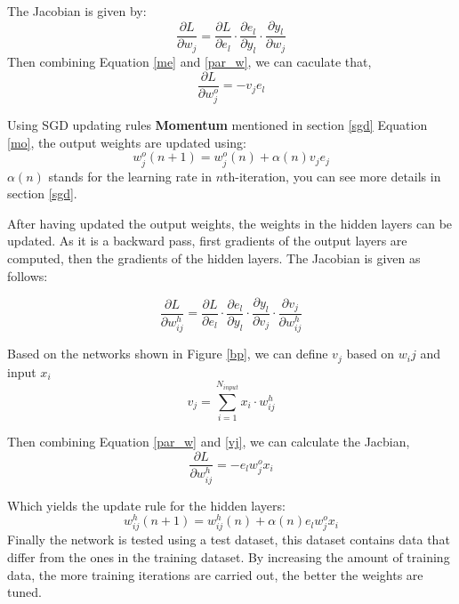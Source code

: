     The Jacobian is given by:
    \begin{equation}
        \frac{\partial L}{\partial w_{j}} = \frac{\partial L}{\partial e_l} \cdot \frac{\partial e_l}{\partial y_l} \cdot \frac{\partial y_l}{\partial w_{j}}
        \label{par_w}
    \end{equation}
    Then combining Equation \ref{me} and \ref{par_w}, we can caculate that,
    \begin{equation}
        \frac{\partial L}{\partial w^{o}_{j}} = -v_j e_l
    \end{equation}

    Using SGD updating rules \textbf{Momentum} mentioned in section \ref{sgd} Equation \ref{mo}, the output weights are updated using:
    \begin{equation}
        w^{o}_{j}(n+1) = w^{o}_{j}(n) + \alpha(n)v_j e_j
    \end{equation}
    $\alpha(n)$ stands for the learning rate in $n$th-iteration, you can see more details in section \ref{sgd}.

    After having updated the output weights, the weights in the hidden layers can be updated. As it is a backward pass, first gradients of the output layers are computed, then the gradients of the hidden layers. The Jacobian is given as follows:

    \begin{equation}
        \frac{\partial L}{\partial w^{h}_{ij}} = \frac{\partial L}{\partial e_l} \cdot \frac{\partial e_l}{\partial y_l} \cdot \frac{\partial y_l}{\partial v_{j}} \cdot \frac{\partial v_j}{\partial w^{h}_{ij}}
        \label{par_w}
    \end{equation}

    Based on the networks shown in Figure \ref{bp}, we can define $v_j$ based on $w_ij$ and input $x_i$
    \begin{equation}
        v_j = \sum_{i=1}^{N_{input}}x_i\cdot w^{h}_{ij}
        \label{vj}
    \end{equation}


    Then combining Equation \ref{par_w} and \ref{vj}, we can calculate the Jacbian,
    \begin{equation}
        \frac{\partial L}{\partial w_{ij}^{h}} = -e_l w_j^{o} x_i
    \end{equation} 

    Which yields the update rule for the hidden layers:
    \begin{equation}
        w_{ij}^{h}(n+1) = w_{ij}^{h}(n)+ \alpha(n)e_l w_j^{o} x_i
    \end{equation}
    Finally the network is tested using a test dataset, this dataset contains data that differ from the ones in the training dataset. By increasing the amount of training data, the more training iterations are carried out, the better the weights are tuned.
